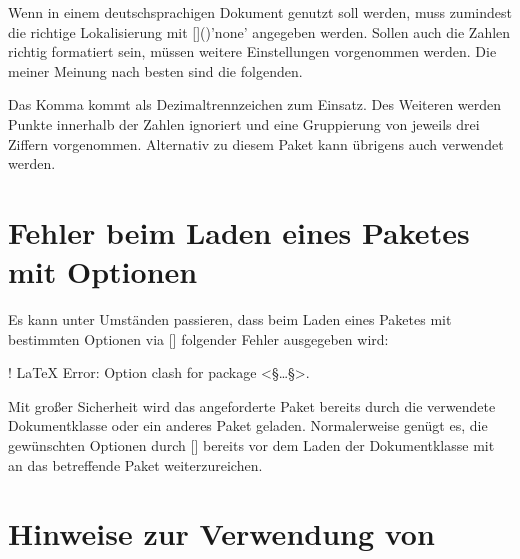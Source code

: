 Wenn  in einem deutschsprachigen Dokument genutzt soll
werden, muss zumindest die richtige Lokalisierung mit
[]()'none' angegeben 
werden. Sollen auch die Zahlen richtig formatiert sein, müssen weitere 
Einstellungen vorgenommen werden. Die meiner Meinung nach besten sind die 
folgenden.
%
\begin{quoting}
\begin{Code}
\end{Code}
\end{quoting}
%
Das Komma kommt als Dezimaltrennzeichen zum Einsatz. Des Weiteren werden Punkte 
innerhalb der Zahlen ignoriert und eine Gruppierung von jeweils drei Ziffern 
vorgenommen. Alternativ zu diesem Paket kann übrigens auch  
verwendet werden.



\section{%
  Fehler beim Laden eines Paketes mit Optionen%
  \label{sec:tips:options}%
}

%
Es kann unter Umständen passieren, dass beim Laden eines Paketes mit bestimmten 
Optionen via [] 
folgender Fehler ausgegeben wird:
%
\begin{quoting}
\begin{Code}
! LaTeX Error: Option clash for package <§\dots§>.
\end{Code}
\end{quoting}
%
Mit großer Sicherheit wird das angeforderte Paket bereits durch die verwendete 
Dokumentklasse oder ein anderes Paket geladen. Normalerweise genügt es, die 
gewünschten Optionen durch 
[] 
bereits vor dem Laden der Dokumentklasse mit  an das 
betreffende Paket weiterzureichen.



\section{%
  Hinweise zur Verwendung von %
  \label{sec:tips:auto-pst-pdf}%
}


